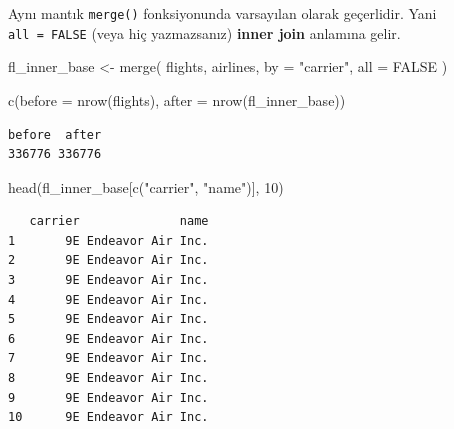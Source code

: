 \documentclass[
  letterpaper,
  DIV=11,
  numbers=noendperiod]{scrreprt}
\newenvironment{Shaded}{\begin{snugshade}}{\end{snugshade}}
\newcommand{\AttributeTok}[1]{\textcolor[rgb]{0.40,0.45,0.13}{#1}}
\newcommand{\ConstantTok}[1]{\textcolor[rgb]{0.56,0.35,0.01}{#1}}
\newcommand{\DecValTok}[1]{\textcolor[rgb]{0.68,0.00,0.00}{#1}}
\newcommand{\FunctionTok}[1]{\textcolor[rgb]{0.28,0.35,0.67}{#1}}
\newcommand{\NormalTok}[1]{\textcolor[rgb]{0.00,0.23,0.31}{#1}}
\newcommand{\OtherTok}[1]{\textcolor[rgb]{0.00,0.23,0.31}{#1}}
\newcommand{\StringTok}[1]{\textcolor[rgb]{0.13,0.47,0.30}{#1}}
\begin{document}
Aynı mantık \texttt{merge()} fonksiyonunda varsayılan olarak geçerlidir.
Yani \texttt{all\ =\ FALSE} (veya hiç yazmazsanız) \textbf{inner join}
anlamına gelir.

\begin{Shaded}
\begin{Highlighting}[]
\NormalTok{fl\_inner\_base }\OtherTok{\textless{}{-}} \FunctionTok{merge}\NormalTok{(}
\NormalTok{flights,}
\NormalTok{airlines,}
\AttributeTok{by =} \StringTok{"carrier"}\NormalTok{,}
\AttributeTok{all =} \ConstantTok{FALSE}
\NormalTok{)}

\FunctionTok{c}\NormalTok{(}\AttributeTok{before =} \FunctionTok{nrow}\NormalTok{(flights), }\AttributeTok{after =} \FunctionTok{nrow}\NormalTok{(fl\_inner\_base))}
\end{Highlighting}
\end{Shaded}

\begin{verbatim}
before  after 
336776 336776 
\end{verbatim}

\begin{Shaded}
\begin{Highlighting}[]
\FunctionTok{head}\NormalTok{(fl\_inner\_base[}\FunctionTok{c}\NormalTok{(}\StringTok{"carrier"}\NormalTok{, }\StringTok{"name"}\NormalTok{)], }\DecValTok{10}\NormalTok{)}
\end{Highlighting}
\end{Shaded}

\begin{verbatim}
   carrier              name
1       9E Endeavor Air Inc.
2       9E Endeavor Air Inc.
3       9E Endeavor Air Inc.
4       9E Endeavor Air Inc.
5       9E Endeavor Air Inc.
6       9E Endeavor Air Inc.
7       9E Endeavor Air Inc.
8       9E Endeavor Air Inc.
9       9E Endeavor Air Inc.
10      9E Endeavor Air Inc.
\end{verbatim}
\end{document}
